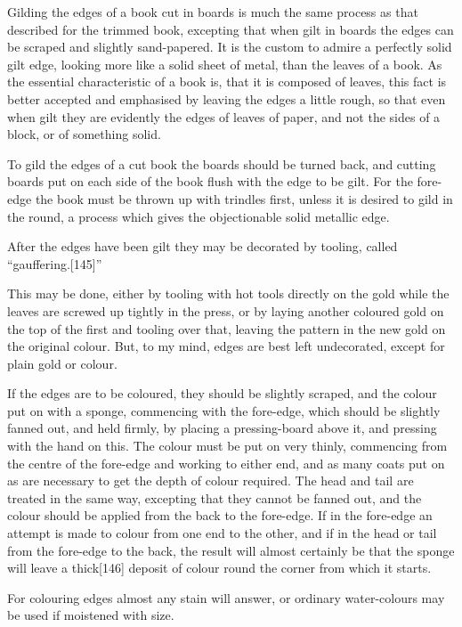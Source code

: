 \documentclass[
]{article}
\begin{document}
Gilding the edges of a book cut in boards is much the same process as
that described for the trimmed book, excepting that when gilt in boards
the edges can be scraped and slightly sand-papered. It is the custom to
admire a perfectly solid gilt edge, looking more like a solid sheet of
metal, than the leaves of a book. As the essential characteristic of a
book is, that it is composed of leaves, this fact is better accepted and
emphasised by leaving the edges a little rough, so that even when gilt
they are evidently the edges of leaves of paper, and not the sides of a
block, or of something solid.

To gild the edges of a cut book the boards should be turned back, and
cutting boards put on each side of the book flush with the edge to be
gilt. For the fore-edge the book must be thrown up with trindles first,
unless it is desired to gild in the round, a process which gives the
objectionable solid metallic edge.

After the edges have been gilt they may be decorated by tooling, called
``gauffering.{\protect\hypertarget{Page_145}{}{{[}145{]}}}''

This may be done, either by tooling with hot tools directly on the gold
while the leaves are screwed up tightly in the press, or by laying
another coloured gold on the top of the first and tooling over that,
leaving the pattern in the new gold on the original colour. But, to my
mind, edges are best left undecorated, except for plain gold or colour.

If the edges are to be coloured, they should be slightly scraped, and
the colour put on with a sponge, commencing with the fore-edge, which
should be slightly fanned out, and held firmly, by placing a
pressing-board above it, and pressing with the hand on this. The colour
must be put on very thinly, commencing from the centre of the fore-edge
and working to either end, and as many coats put on as are necessary to
get the depth of colour required. The head and tail are treated in the
same way, excepting that they cannot be fanned out, and the colour
should be applied from the back to the fore-edge. If in the fore-edge an
attempt is made to colour from one end to the other, and if in the head
or tail from the fore-edge to the back, the result will almost certainly
be that the sponge will leave a
thick{\protect\hypertarget{Page_146}{}{{[}146{]}}} deposit of colour
round the corner from which it starts.

For colouring edges almost any stain will answer, or ordinary
water-colours may be used if moistened with size.
\end{document}

